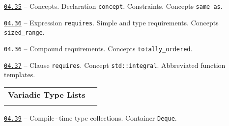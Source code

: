 \documentclass[a4paper,12pt]{article}
\renewenvironment{itemize}
{
    \begin{list}{\labelitemi}
    {
      \setlength{\topsep}{0pt}
      \setlength{\partopsep}{0pt}
      \setlength{\parskip}{0pt}
      \setlength{\itemsep}{0pt}
      \setlength{\parsep}{0pt}
      \setlength{\leftmargin}{14.5pt}
    }
}{\end{list}}
\begin{document}
\begin{itemize}

    \item \href{https://github.com/i-s-m-mipt/Education/blob/master/projects/examples/source/04.35.cpp}{\texttt{04.35}} -- Concepts. Declaration \lstinline{concept}. Constraints. Concepts \lstinline{same_as}.

    \smallskip

    \item \href{https://github.com/i-s-m-mipt/Education/blob/master/projects/examples/source/04.36.cpp}{\texttt{04.36}} -- Expression \lstinline{requires}. Simple and type requirements. Concepts \lstinline{sized_range}.

    \smallskip

    \item \href{https://github.com/i-s-m-mipt/Education/blob/master/projects/examples/source/04.36.cpp}{\texttt{04.36}} -- Compound requirements. Concepts \lstinline{totally_ordered}.

    \smallskip

    \item \href{https://github.com/i-s-m-mipt/Education/blob/master/projects/examples/source/04.37.cpp}{\texttt{04.37}} -- Clause \lstinline{requires}. Concept \lstinline{std::integral}. Abbreviated function templates.

\end{itemize}

\bigskip\medskip

\begin{tabular}{!{\vrule width 1pt}L{3.8cm}!{\vrule width 1pt}L{15.2cm}!{\vrule width 0pt}} 


\textbf{Variadic Type Lists} & \\


\end{tabular}

\medskip\smallskip

\begin{itemize}

    \item \href{https://github.com/i-s-m-mipt/Education/blob/master/projects/examples/source/04.39.cpp}{\texttt{04.39}} -- Compile\,-\,time type collections. Container \lstinline{Deque}. 

\end{itemize}
\end{document}
